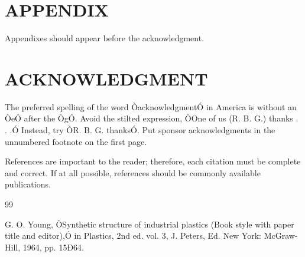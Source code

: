 \documentclass[letterpaper, 10 pt, conference]{ieeeconf}  %
\begin{document}



\section*{APPENDIX}

Appendixes should appear before the acknowledgment.

\section*{ACKNOWLEDGMENT}

The preferred spelling of the word ÒacknowledgmentÓ in America is without an ÒeÓ after the ÒgÓ. Avoid the stilted expression, ÒOne of us (R. B. G.) thanks . . .Ó  Instead, try ÒR. B. G. thanksÓ. Put sponsor acknowledgments in the unnumbered footnote on the first page.




References are important to the reader; therefore, each citation must be complete and correct. If at all possible, references should be commonly available publications.



\begin{thebibliography}{99}

 G. O. Young, ÒSynthetic structure of industrial plastics (Book style with paper title and editor),Ó 	in Plastics, 2nd ed. vol. 3, J. Peters, Ed.  New York: McGraw-Hill, 1964, pp. 15Ð64.


\end{thebibliography}
\end{document}
